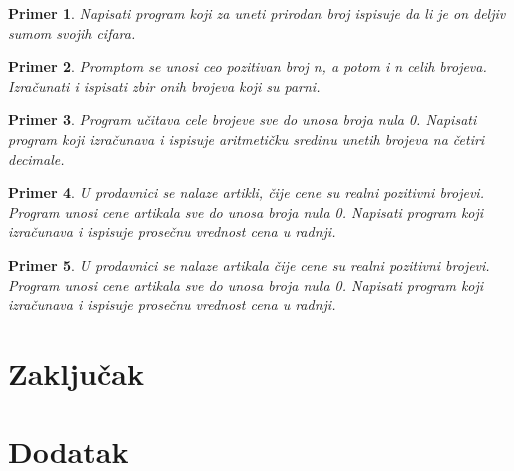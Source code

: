 \documentclass[a4paper]{article}
\newtheorem{primer}{Primer}[section]
\begin{document}
\begin{primer}
Napisati program koji za uneti prirodan broj ispisuje da li
je on deljiv sumom svojih cifara.
\end{primer}

\begin{primer}
Promptom se unosi ceo pozitivan broj n, a potom i n celih
brojeva. Izračunati i ispisati zbir onih brojeva koji su parni.
\end{primer}

\begin{primer}
Program učitava cele brojeve sve do unosa broja nula 0.
Napisati program koji izračunava i ispisuje aritmetičku sredinu unetih brojeva na
četiri decimale.
\end{primer}

\begin{primer}
U prodavnici se nalaze artikli, čije cene su realni pozitivni
brojevi. Program unosi cene artikala sve do unosa broja nula 0. Napisati program
koji izračunava i ispisuje prosečnu vrednost cena u radnji.
\end{primer}

\begin{primer}
U prodavnici se nalaze artikala čije cene su realni pozitivni
brojevi. Program unosi cene artikala sve do unosa broja nula 0. Napisati program
koji izračunava i ispisuje prosečnu vrednost cena u radnji.
\end{primer}




\section{Zaključak}
\label{sec:zakljucak}

 


\appendix
\section{Dodatak}
\end{document}
